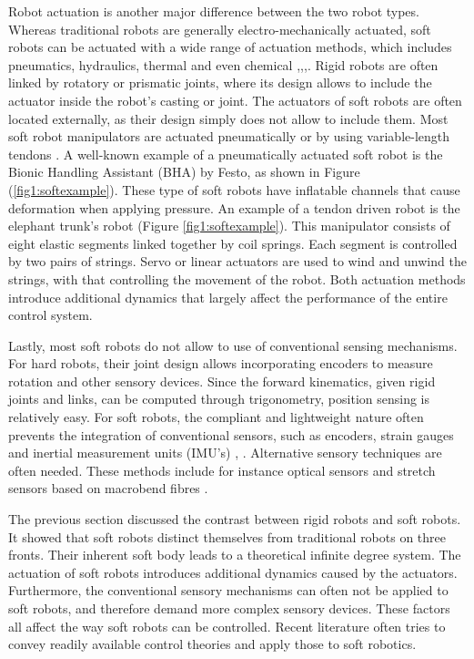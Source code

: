 Robot actuation is another major difference between the two robot types. Whereas traditional robots are generally electro-mechanically actuated, soft robots can be actuated with a wide range of actuation methods, which includes pneumatics, hydraulics, thermal and even chemical \cite{BHA},\cite{marchese2014},\cite{kang2019programmable},\cite{shepherd2013using}. Rigid robots are often linked by rotatory or prismatic joints, where its design allows to include the actuator inside the robot's casting or joint. The actuators of soft robots are often located externally, as their design simply does not allow to include them. Most soft robot manipulators are actuated pneumatically or by using variable-length tendons \cite{Rus2015}. A well-known example of a pneumatically actuated soft robot is the Bionic Handling Assistant (BHA) by Festo, as shown in Figure (\ref{fig1:softexample}). These type of soft robots have inflatable channels that cause deformation when applying pressure. An example of a tendon driven robot is the elephant trunk's robot \cite{cieslak1999elephant} (Figure \ref{fig1:softexample}). This manipulator consists of eight elastic segments linked together by coil springs. Each segment is controlled by two pairs of strings. Servo or linear actuators are used to wind and unwind the strings, with that controlling the movement of the robot. Both actuation methods introduce additional dynamics that largely affect the performance of the entire control system. 

Lastly, most soft robots do not allow to use of conventional sensing mechanisms. For hard robots, their joint design allows incorporating encoders to measure rotation and other sensory devices. Since the forward kinematics, given rigid joints and links, can be computed through trigonometry, position sensing is relatively easy. For soft robots, the compliant and lightweight nature often prevents the integration of conventional sensors, such as encoders, strain gauges and inertial measurement units (IMU's) \cite{Rus2015}, \cite{Lee2017}. Alternative sensory techniques are often needed. These methods include for instance optical sensors and stretch sensors based on macrobend fibres \cite{Sareh2015}.


The previous section discussed the contrast between rigid robots and soft robots. It showed that soft robots distinct themselves from traditional robots on three fronts. Their inherent soft body leads to a theoretical infinite degree system. The actuation of soft robots introduces additional dynamics caused by the actuators. Furthermore, the conventional sensory mechanisms can often not be applied to soft robots, and therefore demand more complex sensory devices. These factors all affect the way soft robots can be controlled. Recent literature often tries to convey readily available control theories and apply those to soft robotics.

